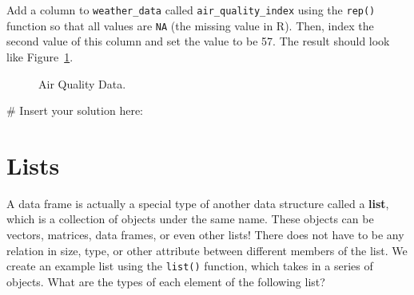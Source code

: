 \documentclass[
  letterpaper,
]{latex/krantz}
\makeatletter
\newenvironment{Shaded}{\begin{snugshade}}{\end{snugshade}}
\newcommand{\CommentTok}[1]{\textcolor[rgb]{0.37,0.37,0.37}{#1}}
\newenvironment{kframe}{%
\medskip{}
\setlength{\fboxsep}{.8em}
 \def\at@end@of@kframe{}%
 \ifinner\ifhmode%
  \def\at@end@of@kframe{\end{minipage}}%
  \begin{minipage}{\columnwidth}%
 \fi\fi%
 \def\FrameCommand##1{\hskip\@totalleftmargin \hskip-\fboxsep
 \colorbox{shadecolor}{##1}\hskip-\fboxsep
     \hskip-\linewidth \hskip-\@totalleftmargin \hskip\columnwidth}%
 \MakeFramed {\advance\hsize-\width
   \@totalleftmargin\z@ \linewidth\hsize
   \@setminipage}}%
 {\par\unskip\endMakeFramed%
 \at@end@of@kframe}
\renewenvironment{Shaded}{\begin{kframe}}{\end{kframe}}
\makeatother
\begin{document}
Add a column to \texttt{weather\_data} called
\texttt{air\_quality\_index} using the \texttt{rep()} function so that
all values are \texttt{NA}  (the missing value in R).
Then, index the second value of this column and set the value to be 57.
The result should look like Figure~\ref{fig-daily-air-quality}.

\begin{figure}


\caption{\label{fig-daily-air-quality}Air Quality Data.}

\end{figure}%

\begin{Shaded}
\begin{Highlighting}[]
\CommentTok{\# Insert your solution here:}
\end{Highlighting}
\end{Shaded}

\section{\texorpdfstring{Lists }{Lists }}\label{lists}

A data frame is actually a special type of another data structure called
a \textbf{list}, which is a collection of objects under the same name.
These objects can be vectors, matrices, data frames, or even other
lists! There does not have to be any relation in size, type, or other
attribute between different members of the list. We create an example
list using the \texttt{list()}
 function, which takes in a
series of objects. What are the types of each element of the following
list?
\end{document}
